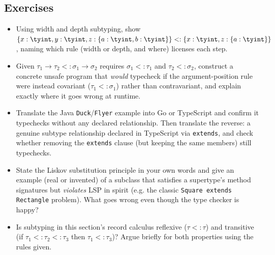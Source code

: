 \subsection{Exercises}
\begin{itemize}
  \item Using width and depth subtyping, show $\{x:\tyint, y:\tyint, z:\{a:\tyint,b:\tyint\}\} <: \{x:\tyint, z:\{a:\tyint\}\}$, naming which rule (width or depth, and where) licenses each step.
  \item Given $\tau_1\to\tau_2 <: \sigma_1\to\sigma_2$ requires $\sigma_1<:\tau_1$ and $\tau_2<:\sigma_2$, construct a concrete unsafe program that \emph{would} typecheck if the argument-position rule were instead covariant ($\tau_1<:\sigma_1$) rather than contravariant, and explain exactly where it goes wrong at runtime.
  \item Translate the Java \lstinline|Duck|/\lstinline|Flyer| example into Go or TypeScript and confirm it typechecks without any declared relationship. Then translate the reverse: a genuine subtype relationship declared in TypeScript via \lstinline|extends|, and check whether removing the \lstinline|extends| clause (but keeping the same members) still typechecks.
  \item State the Liskov substitution principle in your own words and give an example (real or invented) of a subclass that satisfies a supertype's method signatures but \emph{violates} LSP in spirit (e.g. the classic \texttt{Square extends Rectangle} problem). What goes wrong even though the type checker is happy?
  \item Is subtyping in this section's record calculus reflexive ($\tau<:\tau$) and transitive (if $\tau_1<:\tau_2<:\tau_3$ then $\tau_1<:\tau_3$)? Argue briefly for both properties using the rules given.
\end{itemize}
